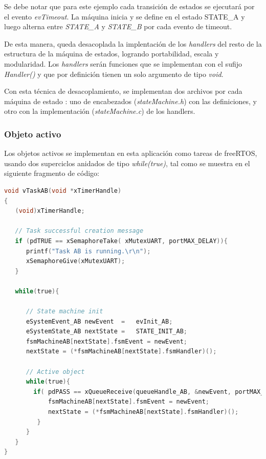 Se debe notar que para este ejemplo cada transición de estados se ejecutará por el evento \textit{evTimeout}. La máquina inicia y se define en el estado STATE\_A y luego alterna entre \textit{STATE\_A} y \textit{STATE\_B} por cada evento de timeout.

De esta manera, queda desacoplada la implentación de los \textit{handlers} del resto de la estructura de la máquina de estados, logrando portabilidad, escala y modularidad. Los \textit{handlers} serán funciones que se implementan con el sufijo \textit{Handler()} y que por definición tienen un solo argumento de tipo \textit{void}.

Con esta técnica de desacoplamiento, se implementan dos archivos por cada máquina de estado : uno de encabezados (\textit{stateMachine.h}) con las definiciones, y otro con la implementación (\textit{stateMachine.c}) de los handlers.




\subsubsection{Objeto activo}
	
Los objetos activos se implementan en esta aplicación como tareas de freeRTOS, usando dos superciclos anidados de tipo \textit{while(true)}, tal como se muestra en el siguiente fragmento de código: 

\begin{lstlisting}[caption=Plantilla de implementación para objetos activos.,
	language=C, 
	backgroundcolor=\color{mygray},
	]
void vTaskAB(void *xTimerHandle)
{
   (void)xTimerHandle;

   // Task successful creation message
   if (pdTRUE == xSemaphoreTake( xMutexUART, portMAX_DELAY)){
      printf("Task AB is running.\r\n");
      xSemaphoreGive(xMutexUART);
   }

   while(true){
      
      // State machine init
      eSystemEvent_AB newEvent	=	evInit_AB;
      eSystemState_AB nextState	=	STATE_INIT_AB;
      fsmMachineAB[nextState].fsmEvent = newEvent; 
      nextState = (*fsmMachineAB[nextState].fsmHandler)();

      // Active object
      while(true){
        if( pdPASS == xQueueReceive(queueHandle_AB, &newEvent, portMAX_DELAY)){
            fsmMachineAB[nextState].fsmEvent = newEvent; 
            nextState = (*fsmMachineAB[nextState].fsmHandler)();
         }
      }
   }
}
\end{lstlisting}

